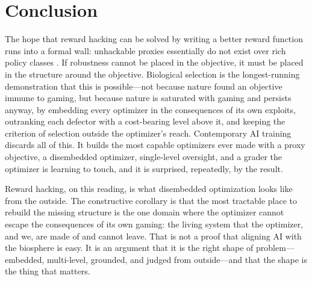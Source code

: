 \documentclass[11pt]{article}
\begin{document}
\section{Conclusion}

The hope that reward hacking can be solved by writing a better reward function runs into a formal wall: unhackable proxies essentially do not exist over rich policy classes \citep{skalse2022}. If robustness cannot be placed in the objective, it must be placed in the structure around the objective. Biological selection is the longest-running demonstration that this is possible---not because nature found an objective immune to gaming, but because nature is saturated with gaming and persists anyway, by embedding every optimizer in the consequences of its own exploits, outranking each defector with a cost-bearing level above it, and keeping the criterion of selection outside the optimizer's reach. Contemporary AI training discards all of this. It builds the most capable optimizers ever made with a proxy objective, a disembedded optimizer, single-level oversight, and a grader the optimizer is learning to touch, and it is surprised, repeatedly, by the result.

Reward hacking, on this reading, is what disembedded optimization looks like from the outside. The constructive corollary is that the most tractable place to rebuild the missing structure is the one domain where the optimizer cannot escape the consequences of its own gaming: the living system that the optimizer, and we, are made of and cannot leave. That is not a proof that aligning AI with the biosphere is easy. It is an argument that it is the right shape of problem---embedded, multi-level, grounded, and judged from outside---and that the shape is the thing that matters.
\end{document}
